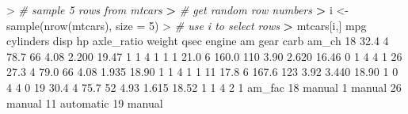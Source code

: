 \documentclass[
]{book}
\newenvironment{Shaded}{\begin{snugshade}}{\end{snugshade}}
\newcommand{\AttributeTok}[1]{\textcolor[rgb]{0.77,0.63,0.00}{#1}}
\newcommand{\CommentTok}[1]{\textcolor[rgb]{0.56,0.35,0.01}{\textit{#1}}}
\newcommand{\DecValTok}[1]{\textcolor[rgb]{0.00,0.00,0.81}{#1}}
\newcommand{\ErrorTok}[1]{\textcolor[rgb]{0.64,0.00,0.00}{\textbf{#1}}}
\newcommand{\FloatTok}[1]{\textcolor[rgb]{0.00,0.00,0.81}{#1}}
\newcommand{\FunctionTok}[1]{\textcolor[rgb]{0.00,0.00,0.00}{#1}}
\newcommand{\NormalTok}[1]{#1}
\newcommand{\OtherTok}[1]{\textcolor[rgb]{0.56,0.35,0.01}{#1}}
\newcommand{\SpecialCharTok}[1]{\textcolor[rgb]{0.00,0.00,0.00}{#1}}
\begin{document}
\begin{Shaded}
\begin{Highlighting}[]
\SpecialCharTok{\textgreater{}} \CommentTok{\# sample 5 rows from mtcars}
\ErrorTok{\textgreater{}} \CommentTok{\# get random row numbers}
\ErrorTok{\textgreater{}}\NormalTok{ i }\OtherTok{\textless{}{-}} \FunctionTok{sample}\NormalTok{(}\FunctionTok{nrow}\NormalTok{(mtcars), }\AttributeTok{size =} \DecValTok{5}\NormalTok{)}
\SpecialCharTok{\textgreater{}} \CommentTok{\# use i to select rows}
\ErrorTok{\textgreater{}}\NormalTok{ mtcars[i,]}
\NormalTok{    mpg cylinders  disp  hp axle\_ratio weight  qsec engine am gear carb am\_ch}
\DecValTok{18} \FloatTok{32.4}         \DecValTok{4}  \FloatTok{78.7}  \DecValTok{66}       \FloatTok{4.08}  \FloatTok{2.200} \FloatTok{19.47}      \DecValTok{1}  \DecValTok{1}    \DecValTok{4}    \DecValTok{1}     \DecValTok{1}
\DecValTok{1}  \FloatTok{21.0}         \DecValTok{6} \FloatTok{160.0} \DecValTok{110}       \FloatTok{3.90}  \FloatTok{2.620} \FloatTok{16.46}      \DecValTok{0}  \DecValTok{1}    \DecValTok{4}    \DecValTok{4}     \DecValTok{1}
\DecValTok{26} \FloatTok{27.3}         \DecValTok{4}  \FloatTok{79.0}  \DecValTok{66}       \FloatTok{4.08}  \FloatTok{1.935} \FloatTok{18.90}      \DecValTok{1}  \DecValTok{1}    \DecValTok{4}    \DecValTok{1}     \DecValTok{1}
\DecValTok{11} \FloatTok{17.8}         \DecValTok{6} \FloatTok{167.6} \DecValTok{123}       \FloatTok{3.92}  \FloatTok{3.440} \FloatTok{18.90}      \DecValTok{1}  \DecValTok{0}    \DecValTok{4}    \DecValTok{4}     \DecValTok{0}
\DecValTok{19} \FloatTok{30.4}         \DecValTok{4}  \FloatTok{75.7}  \DecValTok{52}       \FloatTok{4.93}  \FloatTok{1.615} \FloatTok{18.52}      \DecValTok{1}  \DecValTok{1}    \DecValTok{4}    \DecValTok{2}     \DecValTok{1}
\NormalTok{      am\_fac}
\DecValTok{18}\NormalTok{    manual}
\DecValTok{1}\NormalTok{     manual}
\DecValTok{26}\NormalTok{    manual}
\DecValTok{11}\NormalTok{ automatic}
\DecValTok{19}\NormalTok{    manual}
\end{Highlighting}
\end{Shaded}
\end{document}
